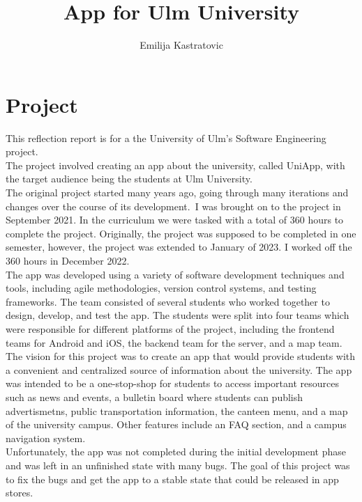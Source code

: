 \documentclass[sf-font,usefira,english]{uulm/sp/article}
\title{App for Ulm University}
\author{Emilija Kastratovic}
\begin{document}
\maketitle
\section{Project}

This reflection report is for a the University of Ulm's Software Engineering project.\\
The project involved creating an app about the university, called UniApp, 
with the target audience being the students at Ulm University.\\

The original project started many years ago, 
going through many iterations and changes over the course of its development.\
I was brought on to the project in September 2021.
In the curriculum we were tasked with a total of 360 hours to complete the project. 
Originally, the project was supposed to be completed in one semester,
however, the project was extended to January of 2023.
I worked off the 360 hours in December 2022.\\

The app was developed using a variety of software development techniques and tools, 
including agile methodologies, version control systems, and testing frameworks. 
The team consisted of several students who worked together to design, develop, and test the app.
The students were split into four teams which were responsible for different platforms of the project, including the
frontend teams for Android and iOS, the backend team for the server, and a map team.\\

The vision for this project was to create an app that would provide students 
with a convenient and centralized source of information about the university. 
The app was intended to be a one-stop-shop for students to access 
important resources such as news and events, a bulletin board where students
can publish advertismetns, public transportation information, the canteen menu,
and a map of the university campus. Other features include an FAQ section, 
and a campus navigation system. \\

Unfortunately, the app was not completed during the initial development phase 
and was left in an unfinished state with many bugs.
The goal of this project was to fix the bugs and get the app to a stable state 
that could be released in app stores. \\
\end{document}
